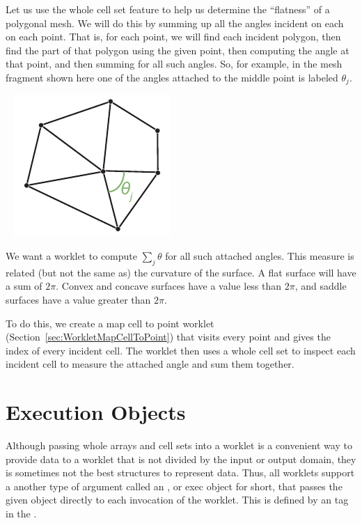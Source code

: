 Let us use the whole cell set feature to help us determine the ``flatness'' of a polygonal mesh.
We will do this by summing up all the angles incident on each on each point.
That is, for each point, we will find each incident polygon, then find the part of that polygon using the given point, then computing the angle at that point, and then summing for all such angles.
So, for example, in the mesh fragment shown here one of the angles attached to the middle point is labeled $\theta_{j}$.

~\hfill
\includegraphics{images/PointIncidentAngles}
\hfill~

\noindent
We want a worklet to compute $\sum_{j} \theta$ for all such attached angles.
This measure is related (but not the same as) the curvature of the surface.
A flat surface will have a sum of $2\pi$.
Convex and concave surfaces have a value less than $2\pi$, and saddle surfaces have a value greater than $2\pi$.

To do this, we create a map cell to point worklet (Section~\ref{sec:WorkletMapCellToPoint}) that visits every point and gives the index of every incident cell.
The worklet then uses a whole cell set to inspect each incident cell to measure the attached angle and sum them together.



\section{Execution Objects}
\label{sec:ExecutionObjects}


Although passing whole arrays and cell sets into a worklet is a convenient way to provide data to a worklet that is not divided by the input or output domain, they is sometimes not the best structures to represent data.
Thus, all worklets support a another type of argument called an , or exec object for short, that passes the given object directly to each invocation of the worklet.
This is defined by an  tag in the \controlsignature.

